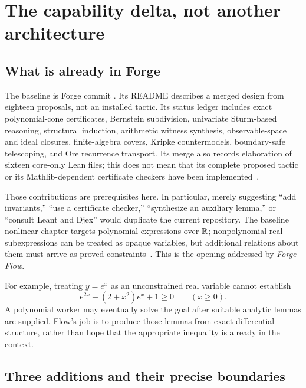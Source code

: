 \section{The capability delta, not another architecture}
\label{sec:delta}

\subsection{What is already in Forge}

The baseline is Forge commit \forgecommit. Its README describes a merged design from eighteen proposals, not an installed tactic. Its status ledger includes exact polynomial-cone certificates, Bernstein subdivision, univariate Sturm-based reasoning, structural induction, arithmetic witness synthesis, observable-space and ideal closures, finite-algebra covers, Kripke countermodels, boundary-safe telescoping, and Ore recurrence transport. Its merge also records elaboration of sixteen core-only Lean files; this does not mean that its complete proposed tactic or its Mathlib-dependent certificate checkers have been implemented~\cite{forge,forge-status,forge-provenance}.

Those contributions are prerequisites here. In particular, merely suggesting ``add invariants,'' ``use a certificate checker,'' ``synthesize an auxiliary lemma,'' or ``consult Leant and Djex'' would duplicate the current repository. The baseline nonlinear chapter targets polynomial expressions over $\mathbb R$; nonpolynomial real subexpressions can be treated as opaque variables, but additional relations about them must arrive as proved constraints~\cite{forge-nonlinear}. This is the opening addressed by \emph{Forge Flow}.

For example, treating $y=e^x$ as an unconstrained real variable cannot establish
\[
 e^{2x}-(2+x^2)e^x+1\ge0\qquad(x\ge0).
\]
A polynomial worker may eventually solve the goal after suitable analytic lemmas are supplied. Flow's job is to produce those lemmas from exact differential structure, rather than hope that the appropriate inequality is already in the context.

\subsection{Three additions and their precise boundaries}

